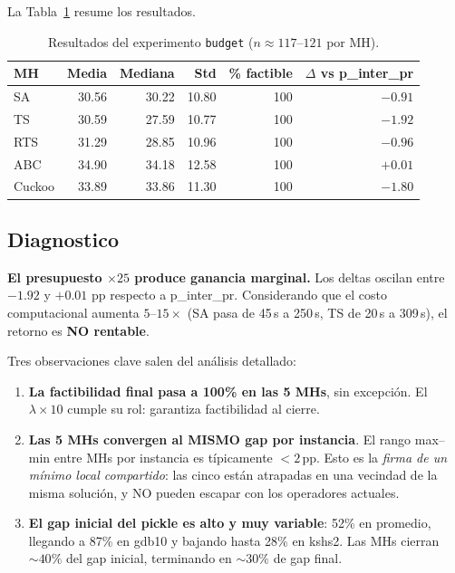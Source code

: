 La Tabla~\ref{tab:budget-resultados} resume los resultados.

\begin{table}[h]
\centering
\caption{Resultados del experimento \texttt{budget} ($n \approx 117$--$121$ por MH).}
\label{tab:budget-resultados}
\small
\begin{tabular}{lrrrrr}
\toprule
MH & Media & Mediana & Std & \% factible & $\Delta$ vs p\_inter\_pr \\
\midrule
SA      & 30.56 & 30.22 & 10.80 & 100 & $-0.91$ \\
TS      & 30.59 & 27.59 & 10.77 & 100 & $-1.92$ \\
RTS     & 31.29 & 28.85 & 10.96 & 100 & $-0.96$ \\
ABC     & 34.90 & 34.18 & 12.58 & 100 & $+0.01$ \\
Cuckoo  & 33.89 & 33.86 & 11.30 & 100 & $-1.80$ \\
\bottomrule
\end{tabular}
\end{table}

\subsection{Diagnostico}

\textbf{El presupuesto $\times 25$ produce ganancia marginal.} Los
deltas oscilan entre $-1.92$ y $+0.01$ pp respecto a p\_inter\_pr.
Considerando que el costo computacional aumenta $5$--$15 \times$
(SA pasa de 45\,s a 250\,s, TS de 20\,s a 309\,s), el retorno es
\textbf{NO rentable}.

Tres observaciones clave salen del análisis detallado:

\begin{enumerate}
\item \textbf{La factibilidad final pasa a 100\% en las 5 MHs}, sin
  excepción. El $\lambda \times 10$ cumple su rol: garantiza
  factibilidad al cierre.
\item \textbf{Las 5 MHs convergen al MISMO gap por instancia}. El
  rango max--min entre MHs por instancia es típicamente $<2$\,pp.
  Esto es la \emph{firma de un mínimo local compartido}: las cinco
  están atrapadas en una vecindad de la misma solución, y NO pueden
  escapar con los operadores actuales.
\item \textbf{El gap inicial del pickle es alto y muy variable}: 52\%
  en promedio, llegando a 87\% en gdb10 y bajando hasta 28\% en kshs2.
  Las MHs cierran $\sim 40\%$ del gap inicial, terminando en
  $\sim 30\%$ de gap final.
\end{enumerate}

